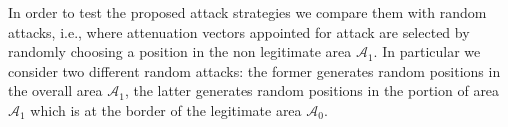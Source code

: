 \documentclass[draftcls,onecolumn,12pt]{IEEEtran}
\begin{document}
In order to test the proposed attack strategies we compare them with random attacks, i.e., where attenuation vectors appointed for attack are selected by randomly choosing a position in the non legitimate area $\mathcal{A}_1$. In particular we consider two different random attacks: the former generates random positions in the overall area $\mathcal{A}_1$, the latter generates random positions in the portion of area $\mathcal{A}_1$ which is at the border of the legitimate area $\mathcal{A}_0$. 


\newpage 



%
%
\renewcommand*{\bibfont}{\footnotesize}

\printbibliography
\end{document}
